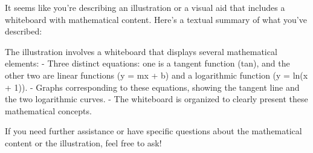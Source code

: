 It seems like you're describing an illustration or a visual aid that includes a whiteboard with mathematical content. Here's a textual summary of what you've described:

The illustration involves a whiteboard that displays several mathematical elements:
- Three distinct equations: one is a tangent function (tan), and the other two are linear functions (y = mx + b) and a logarithmic function (y = ln(x + 1)).
- Graphs corresponding to these equations, showing the tangent line and the two logarithmic curves.
- The whiteboard is organized to clearly present these mathematical concepts.

If you need further assistance or have specific questions about the mathematical content or the illustration, feel free to ask!